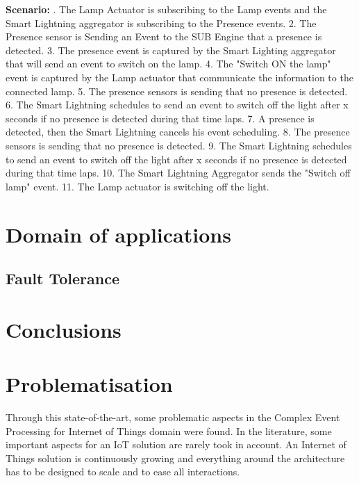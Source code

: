 \documentclass[11pt]{article}
\begin{document}
\newline
\newline
\textbf{Scenario:}
. The Lamp Actuator is subscribing to the Lamp events and the Smart Lightning aggregator is subscribing to the Presence events.
2. The Presence sensor is Sending an Event to the SUB Engine that a presence is detected. 
3. The presence event is captured by the Smart Lighting aggregator that will send an event to switch on the lamp. 
4. The "Switch ON the lamp" event is captured by the Lamp actuator that communicate the information to the connected lamp. 
5. The presence sensors is sending that no presence is detected. 
6. The Smart Lightning schedules to send an event to switch off the light after x seconds if no presence is detected during that time laps.
7. A presence is detected, then the Smart Lightning cancels his event scheduling.
8. The presence sensors is sending that no presence is detected. 
9. The Smart Lightning schedules to send an event to switch off the light after x seconds if no presence is detected during that time laps.
10. The Smart Lightning Aggregator sends the "Switch off lamp" event.
11. The Lamp actuator is switching off the light.

\section{Domain of applications} \label{domain-applications}

\subsection{Fault Tolerance}

\section{Conclusions} \label{conclusions}

\section{Problematisation} \label{problematic}

Through this state-of-the-art, some problematic aspects in the Complex Event Processing for Internet of Things domain were found. In the literature, some important aspects for an IoT solution are rarely took in account. An Internet of Things solution is continuously growing and everything around the architecture has to be designed to scale and to ease all interactions. 
\end{document}
